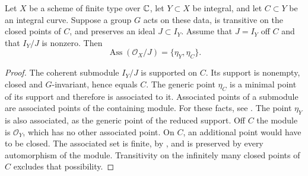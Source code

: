 \begin{lemma}
\label{lem:equivariant-associated-curve}
Let $X$ be a scheme of finite type over $\mathbb C$, let $Y\subset X$ be
integral, and let $C\subset Y$ be an integral curve. Suppose a
group $G$ acts on these data, is transitive on the closed points of
$C$, and preserves an ideal $J\subset I_Y$. Assume that $J=I_Y$
off $C$ and that $I_Y/J$ is nonzero. Then
\[
 \operatorname{Ass}(\mathcal O_X/J)=\{\eta_Y,\eta_C\}.
\]
\end{lemma}
\begin{proof}
The coherent submodule $I_Y/J$ is supported on $C$. Its support
is nonempty, closed and $G$-invariant, hence equals $C$.
The generic point $\eta_C$ is a minimal point of its support and
therefore is associated to it. Associated points of a submodule
are associated points of the containing module. For these facts,
see \cite[Tags 02CE and 02M3]{StacksAss}. The point $\eta_Y$ is
also associated, as the generic point of the reduced support.
Off $C$ the module is $\mathcal O_Y$, which has no other associated
point. On $C$, an additional point would have to be closed.
The associated set is finite, by \cite[Tag 00LC]{StacksAss}, and
is preserved by every automorphism of the module. Transitivity on
the infinitely many closed points of $C$ excludes that possibility.
\end{proof}
